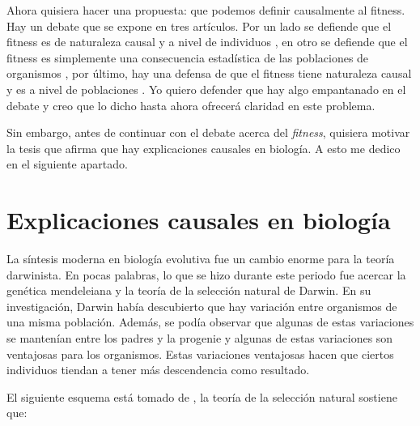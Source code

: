 Ahora quisiera hacer una propuesta: que podemos definir causalmente al fitness. Hay un debate que se expone en tres artículos. Por un lado se defiende que el fitness es de naturaleza causal y a nivel de individuos \cite{Bouchard2004}, en otro se defiende que el fitness es simplemente una consecuencia estadística de las poblaciones de organismos \cite{Walsh2002}, por último, hay una defensa de que el fitness tiene naturaleza causal y es a nivel de poblaciones \cite{Millstein2006}. Yo quiero defender que hay algo empantanado en el debate y creo que lo dicho hasta ahora ofrecerá claridad en este problema.

Sin embargo, antes de continuar con el debate acerca del \emph{fitness}, quisiera motivar la tesis que afirma que hay explicaciones causales en biología. A esto me dedico en el siguiente apartado.


\section{Explicaciones causales en biología}

\noindent La síntesis moderna en biología evolutiva fue un cambio enorme para la teoría darwinista. En pocas palabras, lo que se hizo durante este periodo fue acercar la genética mendeleiana y la teoría de la selección natural de Darwin. En su investigación, Darwin había descubierto que hay variación entre organismos de una misma población. Además, se podía observar que algunas de estas variaciones se mantenían entre los padres y la progenie y algunas de estas variaciones son ventajosas para los organismos. Estas variaciones ventajosas hacen que ciertos individuos tiendan a tener más descendencia como resultado.

El siguiente esquema está tomado de , la teoría de la selección natural sostiene que:


